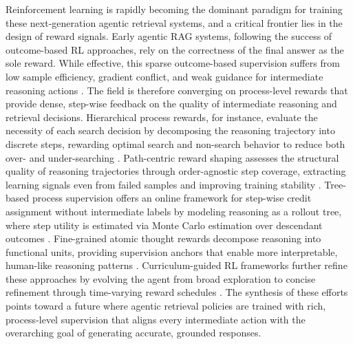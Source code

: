 \documentclass[11pt]{article}
\begin{document}
Reinforcement learning is rapidly becoming the dominant paradigm for training these next-generation agentic retrieval systems, and a critical frontier lies in the design of reward signals. Early agentic RAG systems, following the success of outcome-based RL approaches, rely on the correctness of the final answer as the sole reward. While effective, this sparse outcome-based supervision suffers from low sample efficiency, gradient conflict, and weak guidance for intermediate reasoning actions \cite{ref317,ref315}. The field is therefore converging on process-level rewards that provide dense, step-wise feedback on the quality of intermediate reasoning and retrieval decisions. Hierarchical process rewards, for instance, evaluate the necessity of each search decision by decomposing the reasoning trajectory into discrete steps, rewarding optimal search and non-search behavior to reduce both over- and under-searching \cite{ref316}. Path-centric reward shaping assesses the structural quality of reasoning trajectories through order-agnostic step coverage, extracting learning signals even from failed samples and improving training stability \cite{ref266}. Tree-based process supervision offers an online framework for step-wise credit assignment without intermediate labels by modeling reasoning as a rollout tree, where step utility is estimated via Monte Carlo estimation over descendant outcomes \cite{ref314}. Fine-grained atomic thought rewards decompose reasoning into functional units, providing supervision anchors that enable more interpretable, human-like reasoning patterns \cite{ref611}. Curriculum-guided RL frameworks further refine these approaches by evolving the agent from broad exploration to concise refinement through time-varying reward schedules \cite{ref267}. The synthesis of these efforts points toward a future where agentic retrieval policies are trained with rich, process-level supervision that aligns every intermediate action with the overarching goal of generating accurate, grounded responses.
\end{document}
